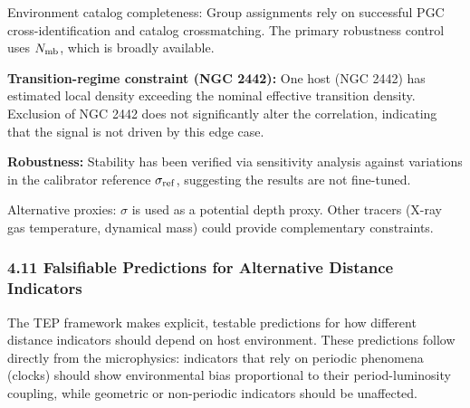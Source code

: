 \documentclass[
]{article}
\begin{document}
Environment catalog completeness: Group assignments rely on successful
PGC cross-identification and catalog crossmatching. The primary
robustness control uses \(N_{\rm mb}\), which is broadly available.

\textbf{Transition-regime constraint (NGC 2442):} One host (NGC 2442)
has estimated local density exceeding the nominal effective transition
density. Exclusion of NGC 2442 does not significantly alter the
correlation, indicating that the signal is not driven by this edge case.

\textbf{Robustness:} Stability has been verified via sensitivity
analysis against variations in the calibrator reference
\(\sigma_{\rm ref}\), suggesting the results are not fine-tuned.

Alternative proxies: \(\sigma\) is used as a potential depth proxy.
Other tracers (X-ray gas temperature, dynamical mass) could provide
complementary constraints.

\subsubsection{4.11 Falsifiable Predictions for Alternative Distance
Indicators}\label{falsifiable-predictions-for-alternative-distance-indicators}

The TEP framework makes explicit, testable predictions for how different
distance indicators should depend on host environment. These predictions
follow directly from the microphysics: indicators that rely on periodic
phenomena (clocks) should show environmental bias proportional to their
period-luminosity coupling, while geometric or non-periodic indicators
should be unaffected.
\end{document}
